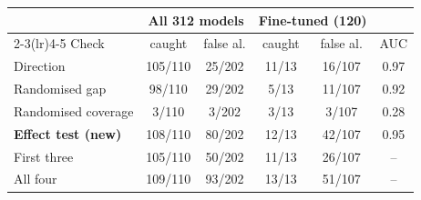 \begin{tabular}{lccccc}
\toprule
 & \multicolumn{2}{c}{All 312 models} & \multicolumn{2}{c}{Fine-tuned (120)} & \\
\cmidrule(lr){2-3}\cmidrule(lr){4-5}
Check & caught & false al. & caught & false al. & AUC \\
\midrule
Direction & 105/110 & 25/202 & 11/13 & 16/107 & 0.97 \\
Randomised gap & 98/110 & 29/202 & 5/13 & 11/107 & 0.92 \\
Randomised coverage & 3/110 & 3/202 & 3/13 & 3/107 & 0.28 \\
\textbf{Effect test (new)} & 108/110 & 80/202 & 12/13 & 42/107 & 0.95 \\
\midrule
First three & 105/110 & 50/202 & 11/13 & 26/107 & -- \\
All four & 109/110 & 93/202 & 13/13 & 51/107 & -- \\
\bottomrule
\end{tabular}
